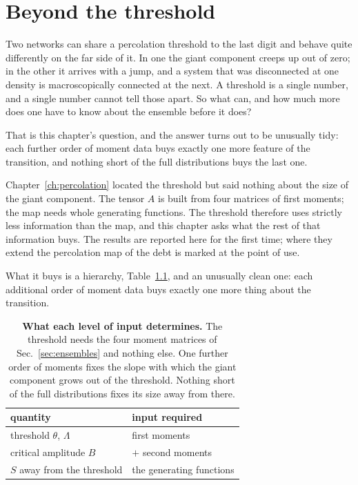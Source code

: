 \chapter{Beyond the threshold}
\label{ch:giant}

Two networks can share a percolation threshold to the last digit and behave
quite differently on the far side of it. In one the giant component creeps up
out of zero; in the other it arrives with a jump, and a system that was
disconnected at one density is macroscopically connected at the next. A
threshold is a single number, and a single number cannot tell those apart. So
what can, and how much more does one have to know about the ensemble before it
does?

That is this chapter's question, and the answer turns out to be unusually tidy:
each further order of moment data buys exactly one more feature of the
transition, and nothing short of the full distributions buys the last one.

Chapter~\ref{ch:percolation} located the threshold but said nothing about the
size of the giant component. The tensor $A$ is built from four matrices of first
moments; the map needs whole generating functions. The threshold therefore uses
strictly less information than the map, and this chapter asks what the
rest of that information buys. The results are reported here for the first
time; where they extend the percolation map of
\citet{vazquez2023pre,vazquez2024comnet} the debt is marked at the point of use.

What it buys is a hierarchy, Table~\ref{tab:hierarchy}, and an unusually clean
one: each additional order of moment data buys exactly one more thing about the
transition.

\begin{table}[b]
\centering\small
\begin{tabular}{ll}
\hline\hline
quantity & input required\\
\hline
threshold $\theta$, $\Lambda$ & first moments\\
critical amplitude $B$ & $+$ second moments\\
$S$ away from the threshold & the generating functions\\
\hline\hline
\end{tabular}
\caption{\textbf{What each level of input determines.} The threshold needs the
four moment matrices of Sec.~\ref{sec:ensembles} and nothing else. One further
order of moments fixes the slope with which the giant component grows out of
the threshold. Nothing short of the full distributions fixes its size away from
there.}
\label{tab:hierarchy}
\end{table}

